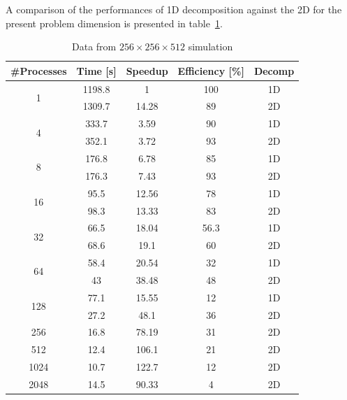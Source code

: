 \par
A comparison of the performances of 1D decomposition against the 2D for the present problem dimension is presented in table~\ref{128:data}.
\begin{table}
\caption{Data from $256\times 256\times 512$  simulation}
\begin{center}
\begin{tabular}{c c c c c}
\toprule
\textbf{\#Processes} & \textbf{Time [s]} & \textbf{Speedup} & \textbf{Efficiency [\%]} & \textbf{Decomp}\\
\midrule
\multirow{2}{*}{1} &  1198.8 & 1 & 100 & 1D\\
& 1309.7 & 14.28 & 89 & 2D\\
\hline
\multirow{2}{*}{4} &  333.7 & 3.59 & 90 & 1D\\
& 352.1 & 3.72 & 93 & 2D \\
\hline
\multirow{2}{*}{8} &  176.8 & 6.78 & 85 & 1D\\
& 176.3 & 7.43 & 93 & 2D\\
\hline
\multirow{2}{*}{16} & 95.5 & 12.56 & 78 & 1D\\
& 98.3 & 13.33 & 83 & 2D\\
\hline
\multirow{2}{*}{32} & 66.5 & 18.04 & 56.3 & 1D\\
& 68.6 & 19.1 & 60 & 2D\\
\hline
\multirow{2}{*}{64} & 58.4 & 20.54 & 32 & 1D\\
& 43 & 38.48 & 48 & 2D\\
\hline 
\multirow{2}{*}{128} & 77.1 & 15.55 & 12 & 1D\\
& 27.2 & 48.1 & 36 & 2D\\
\hline
256 & 16.8 & 78.19 & 31 & 2D\\
512 & 12.4 & 106.1 & 21 & 2D\\
1024 & 10.7 & 122.7 & 12 & 2D\\
2048 & 14.5 & 90.33 & 4 & 2D\\
\bottomrule
\end{tabular}
\end{center}
\label{128:data}
\end{table}


